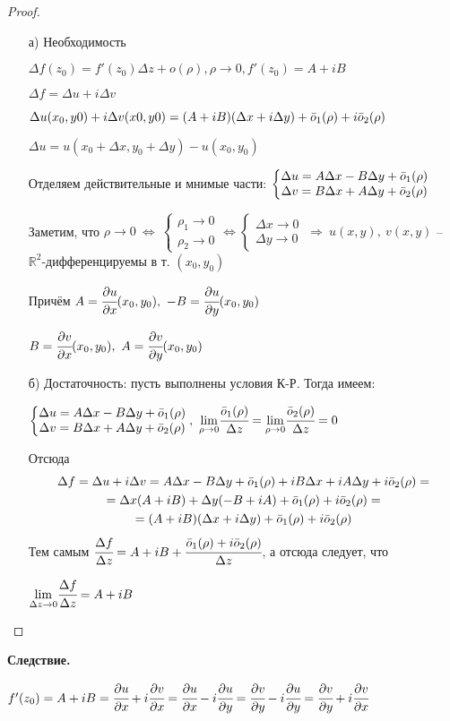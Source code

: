 \documentclass[draft]{article}
\newcommand{\forcenewline}{$\phantom{\mbox{newline}}$\newline}
\newcommand{\dd}{\partial}
\newcommand{\then}{\ \Rightarrow\ }
\newcommand{\R}{\mathbb{R}}
\newcommand{\mlim}[1]{\underset{#1}{\lim}}
\newcommand{\LRA}{\Leftrightarrow}
\newcommand{\D}{\Delta}
\renewcommand{\o}{\Bar{o}}
\newcommand{\sys}[1]{\left\{\begin{matrix}#1\end{matrix}\right.}
\theoremstyle{remark}
\begin{document}
\begin{proof}
\forcenewline
\begin{itemize}
\item[а)] Необходимость

$\D f(z_0)=f'(z_0)\D z+o(\rho), \rho \to 0, f'(z_0)=A+iB$

$\D f=\D u+i\D v$

$\D u(x_0,y0)+i\D v(x0,y0)=(A+iB)(\D x+i\D y)+\o_1(\rho)+i\o_2(\rho)$

$\D u=u(x_0+\D x,y_0+\D y)-u(x_0,y_0)$

Отделяем действительные и мнимые части:
$\sys{\D u=A\D x-B\D y+\o_1(\rho) \\ \D v=B\D x+A\D y+\o_2(\rho)}$%

Заметим, что $\rho\to 0\ \LRA\ \sys{\rho_1 \to 0 \\ \rho_2 \to 0} \LRA \sys{\D x\to 0 \\ \D y\to 0} \then u(x,y),\ v(x,y)$ -- $\R^2$-дифференцируемы в т. $(x_0,y_0)$

Причём $A=\cfrac{\dd u}{\dd x}(x_0,y_0),\ -B=\cfrac{\dd u}{\dd y}(x_0,y_0)$

$B=\cfrac{\dd v}{\dd x}(x_0,y_0),\ A=\cfrac{\dd v}{\dd y}(x_0,y_0)$

\item[б)] Достаточность: пусть выполнены условия К-Р. Тогда имеем:

$\sys{\D u=A\D x-B\D y+\o_1(\rho)\\\D v=B\D x+A\D y+\o_2(\rho)},\ \mlim{\rho\to 0}\cfrac{\o_1(\rho)}{\D z}=\mlim{\rho\to0}\cfrac{\o_2(\rho)}{\D z}=0$

Отсюда
\begin{multline*}
\D f=\D u+i\D v=A\D x-B\D y+\o_1(\rho)+iB\D x+iA\D y+i\o_2(\rho)=\\
=\D x(A+iB)+\D y(-B+iA)+\o_1(\rho)+i\o_2(\rho)=\\
=(A+iB)(\D x+i\D y)+\o_1(\rho)+i\o_2(\rho)
\end{multline*}
Тем самым $\cfrac{\D f}{\D z}=A+iB+\cfrac{\o_1(\rho)+i\o_2(\rho)}{\D z}$, а отсюда следует, что

$\mlim{\D z\to0}\cfrac{\D f}{\D z}=A+iB$

\end{itemize}
\end{proof}
{\bfseries Следствие.}

$f'(z_0)=A+iB=\cfrac{\dd u}{\dd x}+i\cfrac{\dd v}{\dd x}=\cfrac{\dd u}{\dd x}-i\cfrac{\dd u}{\dd y}=\cfrac{\dd v}{\dd y}-i\cfrac{\dd u}{\dd y}=\cfrac{\dd v}{\dd y}+i\cfrac{\dd v}{\dd x}$
\end{document}
